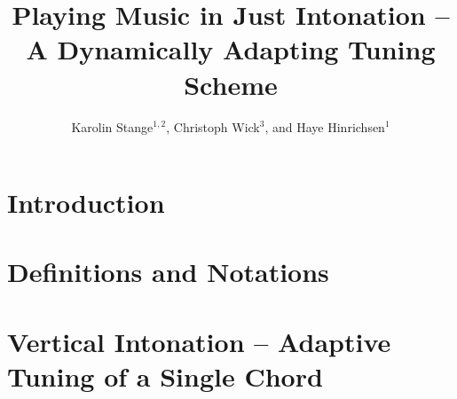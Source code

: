 \documentclass[a4paper,11pt]{iopart}
\begin{document}
\title{Playing Music in Just Intonation -- \\A Dynamically Adapting Tuning Scheme}
\author{Karolin Stange$^{1,2}$, Christoph Wick$^3$, and Haye Hinrichsen$^1$}
\address{$^1$ Fakult\"at f\"ur Physik und Astronomie, Universit\"at W\"urzburg\\ Am Hubland, 97074 W\"urzburg, Germany}
\address{$^2$ Hochschule f\"ur Musik, Hofstallstr. 6–8, 97070 W\"urzburg, Germany}
\address{$^3$ Fakult\"at f\"ur Mathematik und Informatik, Universit\"at W\"urzburg\\ Am Hubland, 97074 W\"urzburg, Germany}

\begin{abstract}

\end{abstract}


\def\d{{\rm d}}
\def\0{\emptyset}

\def\alphavec{{\vect{\alpha}}}

\def\comment#1{\color{red}[\textbf{comment: #1}]\color{black}}
\def\mark#1{\color{red}#1 \color{black}}

\def\ET{{\rm\scriptscriptstyle ET}}
\def\JI{{\rm\scriptscriptstyle JI}}
\def\OPT{{\rm\scriptscriptstyle opt}}
\def\REF{{\rm\scriptscriptstyle ref}}

\pagestyle{plain}

\section{Introduction}



\section{Definitions and Notations}



\section{Vertical Intonation -- Adaptive Tuning of a Single Chord}
\end{document}
